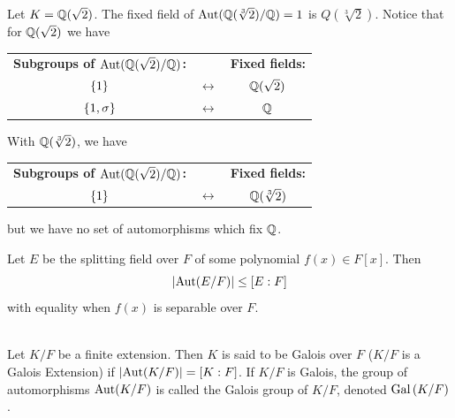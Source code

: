 \begin{example}
    Let $K = \mathbb{Q}(\sqrt{2})$. The fixed field of $\text{Aut}(\mathbb{Q}(\sqrt[3]{2})/\mathbb{Q}) = 1$ is $Q(\sqrt[3]{2})$. Notice that for $\mathbb{Q}(\sqrt{2})$ we have

    \begin{center}
        \begin{tabular}{ccc}
            \textbf{Subgroups of $\text{Aut}(\mathbb{Q}({\sqrt{2}})/\mathbb{Q})$:} & & \textbf{Fixed fields:} \\ 
            \noalign{\medskip} %
            
            $\left\{1\right\}$ & $\longleftrightarrow$ & $\mathbb{Q}(\sqrt{2})$ \\
            $\left\{1, \sigma\right\}$ & $\longleftrightarrow$ & $\mathbb{Q}$
        \end{tabular}
    \end{center}

    With $\mathbb{Q}(\sqrt[3]{2})$, we have 
    \begin{center}
        \begin{tabular}{ccc}
            \textbf{Subgroups of $\text{Aut}(\mathbb{Q}({\sqrt{2}})/\mathbb{Q})$:} & & \textbf{Fixed fields:} \\ 
            \noalign{\medskip} %
            
            $\left\{1\right\}$ & $\longleftrightarrow$ & $\mathbb{Q}(\sqrt[3]{2})$
        \end{tabular}
    \end{center}
    but we have no set of automorphisms which fix $\mathbb{Q}$.
\end{example}

\begin{proposition}
    Let $E$ be the splitting field over $F$ of some polynomial $f(x) \in F[x]$. Then
    $$|\text{Aut}(E/F)| \leq [E:F]$$
    with equality when $f(x)$ is separable over $F$.
\end{proposition}

\begin{definition} \leavevmode \\
    Let $K/F$ be a finite extension. Then $K$ is said to be Galois over $F$ ($K/F$ is a Galois Extension) if $|\text{Aut}(K/F)| = [K:F]$. If $K/F$ is Galois, the group of automorphisms $\text{Aut}(K/F)$ is called the Galois group of $K/F$, denoted $\text{Gal}\left(K/F\right)$.
\end{definition}

